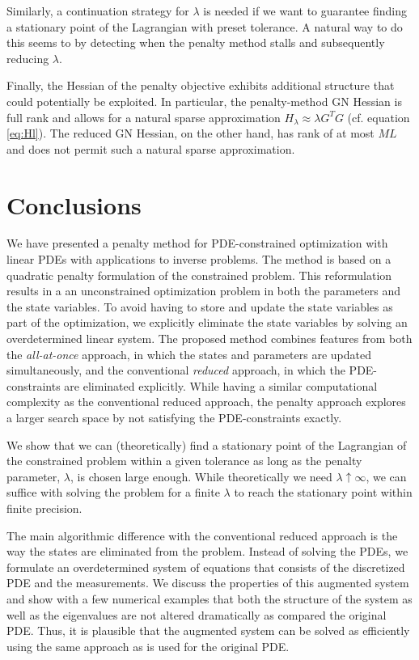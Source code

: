 \documentclass{iopart}
\begin{document}
{Similarly, a continuation strategy for $\lambda$ is needed if we want to guarantee finding a stationary point of the Lagrangian with preset tolerance. A natural way to do this seems to by detecting when the penalty method stalls and subsequently reducing $\lambda$.

Finally, the Hessian of the penalty objective exhibits additional structure that could potentially be exploited. In particular, the penalty-method GN Hessian is full rank and allows for a natural sparse approximation $H_{\lambda} \approx \lambda G^TG$ (cf. equation \ref{eq:Hl}). The reduced GN Hessian, on the other hand, has rank of at most $ML$ and does not permit such a natural sparse approximation.

\section{Conclusions}
\label{conclusion}
We have presented a penalty method for PDE-constrained optimization with linear PDEs with applications to inverse problems. The method is based on a quadratic penalty formulation of the constrained problem. This reformulation results in a an unconstrained optimization problem in both the parameters and the state variables. To avoid having to store and update the state variables as part of the optimization, we explicitly eliminate
the state variables by solving an overdetermined linear system. The proposed method combines features from both the \emph{all-at-once} approach, in which the states and parameters are updated simultaneously, and the conventional \emph{reduced} approach, in which the PDE-constraints are eliminated explicitly. While having a similar computational complexity as the conventional reduced approach, the penalty approach explores a larger search space by not satisfying the PDE-constraints exactly. 

We show that we can (theoretically) find a stationary point of the Lagrangian of the constrained problem within a given tolerance as long as the penalty parameter, $\lambda$,
is chosen large enough. While theoretically we need $\lambda \uparrow \infty$, we can suffice with solving the problem for a finite $\lambda$ to reach the stationary point within finite precision. 

The main algorithmic difference with the conventional reduced approach is the way the states are eliminated from the problem. Instead of solving the PDEs, we formulate an overdetermined system of equations that consists of the discretized PDE and the measurements. We discuss the properties of this augmented system and show with a few numerical examples that both the structure of the system as well as the eigenvalues are not altered dramatically as compared the original PDE. Thus, it is plausible that the augmented system can be solved as efficiently using the same approach as is used for the original PDE.

}
\end{document}
